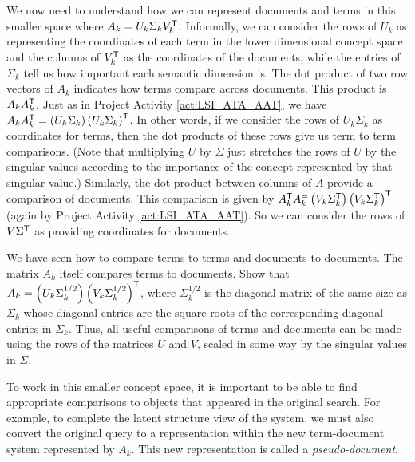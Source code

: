 We now need to understand how we can represent documents and terms in this smaller space where $A_k = U_k \Sigma_k V_k^{\mathsf{T}}$. Informally, we can consider the rows of $U_k$ as representing the coordinates of each term in the lower dimensional concept space and the columns of $V_k^{\mathsf{T}}$ as the coordinates of the documents, while the entries of $\Sigma_k$ tell us how important each semantic dimension is. The dot product of two row vectors of $A_k$ indicates how terms compare across documents. This product is $A_kA_k^{\mathsf{T}}$. Just as in Project Activity \ref{act:LSI_ATA_AAT}, we have $A_kA_k^{\mathsf{T}} = \left(U_k \Sigma_k\right) \left(U_k\Sigma_k\right)^{\mathsf{T}}$. In other words, if we consider the rows of $U_k\Sigma_k$ as coordinates for terms, then the dot products of these rows give us term to term comparisons. (Note that multiplying $U$ by $\Sigma$ just stretches the rows of $U$ by the singular values according to the importance of the concept represented by that singular value.) Similarly, the dot product between columns of $A$ provide a comparison of documents. This comparison is given by $A_k^{\mathsf{T}}A_k^  =  \left(V_k \Sigma_k^{\mathsf{T}}\right) \left(V_k\Sigma_k^{\mathsf{T}}\right)^{\mathsf{T}}$ (again by Project Activity \ref{act:LSI_ATA_AAT}). So we can consider the rows of $V\Sigma^{\mathsf{T}}$ as providing coordinates for documents.   

\begin{pactivity} \label{act:LSI_term_document} We have seen how to compare terms to terms and documents to documents. The matrix $A_k$ itself compares terms to documents. Show that $A_k = \left(U_k \Sigma_k^{1/2}\right) \left(V_k\Sigma_k^{1/2}\right)^{\mathsf{T}}$, where $\Sigma_k^{1/2}$ is the diagonal matrix of the same size as $\Sigma_k$ whose diagonal entries are the square roots of the corresponding diagonal entries in $\Sigma_k$. Thus, all useful comparisons of terms and documents can be made using the rows of the matrices $U$ and $V$, scaled in some way by the singular values in $\Sigma$.  

\end{pactivity}

To work in this smaller concept space, it is important to be able to find appropriate comparisons to objects that appeared in the original search. For example, to complete the latent structure view of the system, we must also convert the original query to a representation within the new term-document system represented by $A_k$. This new representation is called a \emph{pseudo-document}. 

